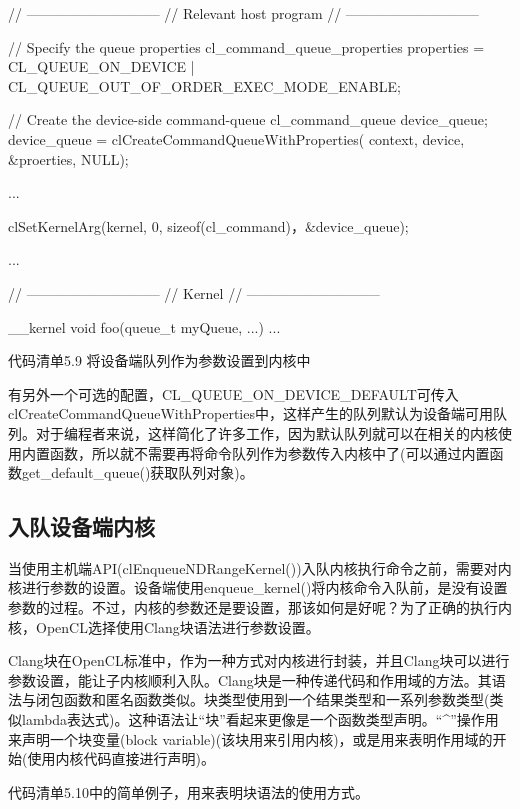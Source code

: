 \begin{codebox}[cpp]
// -----------------------------
// Relevant host program
// -----------------------------

// Specify the queue properties
cl_command_queue_properties properties =
  CL_QUEUE_ON_DEVICE |
  CL_QUEUE_OUT_OF_ORDER_EXEC_MODE_ENABLE;

// Create the device-side command-queue
cl_command_queue device_queue;
device_queue = clCreateCommandQueueWithProperties(
  context,
  device,
  &proerties,
  NULL);

...

clSetKernelArg(kernel, 0, sizeof(cl_command)，&device_queue);

...

// -----------------------------
// Kernel
// -----------------------------

__kernel
void foo(queue_t myQueue, ...){
  ...
}
\end{codebox}

代码清单5.9 将设备端队列作为参数设置到内核中

有另外一个可选的配置，CL\_\allowbreak{}QUEUE\_\allowbreak{}ON\_\allowbreak{}DEVICE\_\allowbreak{}DEFAULT可传入clCreateCommandQueueWithProperties中，这样产生的队列默认为设备端可用队列。对于编程者来说，这样简化了许多工作，因为默认队列就可以在相关的内核使用内置函数，所以就不需要再将命令队列作为参数传入内核中了(可以通过内置函数get\_\allowbreak{}default\_\allowbreak{}queue()获取队列对象)。

\subsection{入队设备端内核}

当使用主机端API(clEnqueueNDRangeKernel())入队内核执行命令之前，需要对内核进行参数的设置。设备端使用enqueue\_\allowbreak{}kernel()将内核命令入队前，是没有设置参数的过程。不过，内核的参数还是要设置，那该如何是好呢？为了正确的执行内核，OpenCL选择使用Clang块语法进行参数设置。

Clang块在OpenCL标准中，作为一种方式对内核进行封装，并且Clang块可以进行参数设置，能让子内核顺利入队。Clang块是一种传递代码和作用域的方法。其语法与闭包函数和匿名函数类似。块类型使用到一个结果类型和一系列参数类型(类似lambda表达式)。这种语法让“块”看起来更像是一个函数类型声明。“\textasciicircum{}”操作用来声明一个块变量(block variable)(该块用来引用内核)，或是用来表明作用域的开始(使用内核代码直接进行声明)。

代码清单5.10中的简单例子，用来表明块语法的使用方式。

